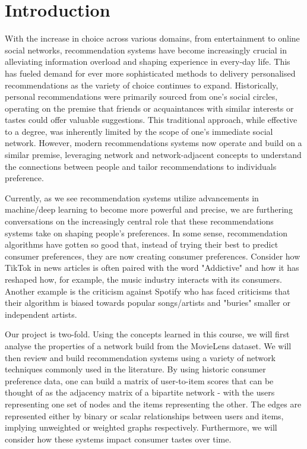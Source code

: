 \documentclass[12pt]{article}
\numberwithin{equation}{section}
\begin{document}
\newpage

\section{Introduction}

With the increase in choice across various domains, from entertainment to online social networks, recommendation systems have become increasingly crucial in alleviating information overload and shaping experience in every-day life. This has fueled demand for ever more sophisticated methods to delivery personalised recommendations as the variety of choice continues to expand. Historically, personal recommendations were primarily sourced from one's social circles, operating on the premise that friends or acquaintances with similar interests or tastes could offer valuable suggestions. This traditional approach, while effective to a degree, was inherently limited by the scope of one's immediate social network. However, modern recommendations systems now operate and build on a similar premise, leveraging network and network-adjacent concepts to understand the connections between people and tailor recommendations to individuals preference.

Currently, as we see recommendation systems utilize advancements in machine/deep learning to become more powerful and precise, we are furthering conversations on the increasingly central role that these recommendations systems take on shaping people's preferences. In some sense, recommendation algorithms have gotten so good that, instead of trying their best to predict consumer preferences, they are now creating consumer preferences. Consider how TikTok in news articles is often paired with the word "Addictive" and how it has reshaped how, for example, the music industry interacts with its consumers. Another example is the criticism against Spotify who has faced criticisms that their algorithm is biased towards popular songs/artists and "buries" smaller or independent artists.

Our project is two-fold. Using the concepts learned in this course, we will first analyse the properties of a network build from the MovieLens dataset. We will then review and build recommendation systems using a variety of network techniques commonly used in the literature. By using historic consumer preference data, one can build a matrix of user-to-item scores that can be thought of as the adjacency matrix of a bipartite network - with the users representing one set of nodes and the items representing the other. The edges are represented either by binary or scalar relationships between users and items, implying unweighted or weighted graphs respectively. Furthermore, we will consider how these systems impact consumer tastes over time.
\end{document}
